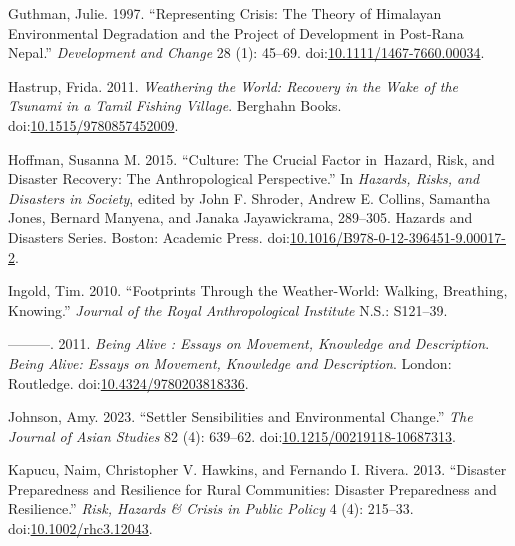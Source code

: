 \documentclass[
]{article}
\newlength{\cslhangindent}
\newenvironment{CSLReferences}[2] %
 {\begin{list}{}{%
  \setlength{\itemindent}{0pt}
  \setlength{\leftmargin}{0pt}
  \setlength{\parsep}{0pt}
  \ifodd #1
   \setlength{\leftmargin}{\cslhangindent}
   \setlength{\itemindent}{-1\cslhangindent}
  \fi
  \setlength{\itemsep}{#2\baselineskip}}}
 {\end{list}}
\begin{document}
\begin{CSLReferences}{1}{0}
Guthman, Julie. 1997. {``Representing {Crisis}: {The Theory} of {Himalayan Environmental Degradation} and the {Project} of {Development} in {Post-Rana Nepal}.''} \emph{Development and Change} 28 (1): 45--69. doi:\href{https://doi.org/10.1111/1467-7660.00034}{10.1111/1467-7660.00034}.

Hastrup, Frida. 2011. \emph{Weathering the {World}: {Recovery} in the {Wake} of the {Tsunami} in a {Tamil Fishing Village}}. Berghahn Books. doi:\href{https://doi.org/10.1515/9780857452009}{10.1515/9780857452009}.

Hoffman, Susanna M. 2015. {``Culture: {The Crucial Factor} in~{Hazard}, {Risk}, and {Disaster Recovery}: {The Anthropological Perspective}.''} In \emph{Hazards, {Risks}, and {Disasters} in {Society}}, edited by John F. Shroder, Andrew E. Collins, Samantha Jones, Bernard Manyena, and Janaka Jayawickrama, 289--305. Hazards and {Disasters Series}. Boston: Academic Press. doi:\href{https://doi.org/10.1016/B978-0-12-396451-9.00017-2}{10.1016/B978-0-12-396451-9.00017-2}.

Ingold, Tim. 2010. {``Footprints Through the Weather-World: Walking, Breathing, Knowing.''} \emph{Journal of the Royal Anthropological Institute} N.S.: S121--39.

---------. 2011. \emph{Being {Alive} : {Essays} on {Movement}, {Knowledge} and {Description}}. \emph{Being Alive: Essays on Movement, Knowledge and Description}. London: Routledge. doi:\href{https://doi.org/10.4324/9780203818336}{10.4324/9780203818336}.

Johnson, Amy. 2023. {``Settler {Sensibilities} and {Environmental Change}.''} \emph{The Journal of Asian Studies} 82 (4): 639--62. doi:\href{https://doi.org/10.1215/00219118-10687313}{10.1215/00219118-10687313}.

Kapucu, Naim, Christopher V. Hawkins, and Fernando I. Rivera. 2013. {``Disaster {Preparedness} and {Resilience} for {Rural Communities}: {Disaster Preparedness} and {Resilience}.''} \emph{Risk, Hazards \& Crisis in Public Policy} 4 (4): 215--33. doi:\href{https://doi.org/10.1002/rhc3.12043}{10.1002/rhc3.12043}.


\end{CSLReferences}
\end{document}
